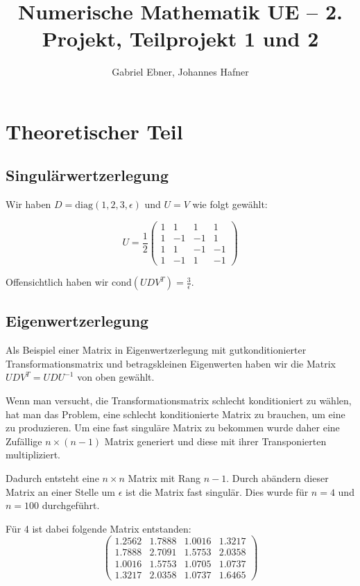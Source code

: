\documentclass{scrartcl}
\begin{document}
\title{Numerische Mathematik UE -- 2. Projekt, Teilprojekt 1 und 2}
\author{Gabriel Ebner, Johannes Hafner}
\maketitle

\section{Theoretischer Teil}

\subsection{Singulärwertzerlegung}

Wir haben \(D = \mathrm{diag}(1,2,3,\epsilon)\) und \(U=V\) wie folgt gewählt:

\[ U = \frac 1 2 \left( \begin{array}{rrrr}
 1 &  1 &  1 &  1 \\
 1 & -1 & -1 &  1 \\
 1 &  1 & -1 & -1 \\
 1 & -1 &  1 & -1
\end{array} \right) \]

Offensichtlich haben wir \(\mathrm{cond}(UDV^T) = \frac 3 \epsilon\).

\subsection{Eigenwertzerlegung}

Als Beispiel einer Matrix in Eigenwertzerlegung mit gutkonditionierter
Transformationsmatrix und betragskleinen Eigenwerten haben wir die Matrix
\(UDV^T = UDU^{-1}\) von oben gewählt.

Wenn man versucht, die Transformationsmatrix schlecht konditioniert zu wählen, hat man das Problem, eine schlecht konditionierte Matrix zu brauchen, um eine zu produzieren.
Um eine fast singuläre Matrix zu bekommen wurde daher eine Zufällige \(n\times (n-1)\) Matrix generiert und diese mit ihrer Transponierten multipliziert.

Dadurch entsteht eine \(n\times n\) Matrix mit Rang \(n-1\). Durch abändern dieser Matrix an einer Stelle um \(\epsilon\) ist die Matrix fast singulär.
Dies wurde für \(n=4\) und \(n=100\) durchgeführt.

Für 4 ist dabei folgende Matrix entstanden:
\[ \left( \begin{array}{rrrr}
		1.2562 & 1.7888 & 1.0016 & 1.3217 \\
    1.7888 & 2.7091 & 1.5753 & 2.0358 \\
    1.0016 & 1.5753 & 1.0705 & 1.0737 \\
    1.3217 & 2.0358 & 1.0737 & 1.6465\end{array} \right) \]
\end{document}
